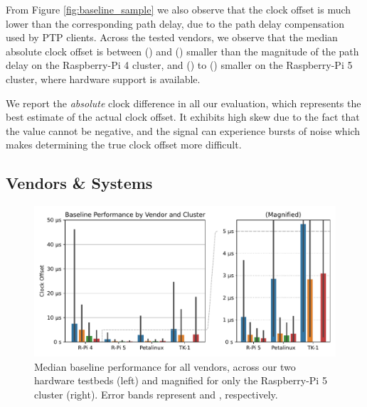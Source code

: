 From Figure \ref{fig:baseline_sample} we also observe that the clock offset is much lower than the corresponding path delay, due to the path delay compensation used by PTP clients. Across the tested vendors, we observe that the median absolute clock offset is between \fRatio{\cmpMin} (\fVendor{\cmpMinArg}) and \fRatio{\cmpMax} (\fVendor{\cmpMaxArg}) smaller than the magnitude of the path delay on the Raspberry-Pi 4 cluster,%
%
and \fRatio[-1]{\cmpMin} (\fVendor{\cmpMinArg}) to \fRatio[-1]{\cmpMax} (\fVendor{\cmpMaxArg}) smaller on the Raspberry-Pi 5 cluster, where hardware support is available.

We report the \emph{absolute} clock difference in all our evaluation, which
represents the best estimate of the actual clock offset.
It exhibits high skew due to the fact that the value cannot be negative, and
the signal can experience bursts of noise which makes determining the true
clock offset more difficult.


\subsection{Vendors \& Systems}

\begin{figure}
    \centering
    \includegraphics[width=\linewidth]{res/generated/base/vendor_comparison.pdf}
    \legend
    \caption{Median baseline performance for all vendors, across our two hardware testbeds (left) and magnified for only the Raspberry-Pi 5 cluster (right). Error bands represent \PFive{} and \PNineFive{}, respectively.}
    \label{fig:baseline}
\end{figure}


